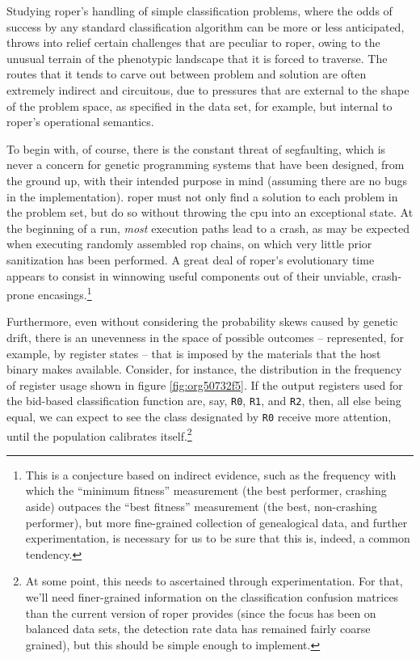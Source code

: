 \documentclass[12pt,glossary]{dalthesis}
\begin{document}
Studying \gls{roper}'s handling of simple classification problems, where the
odds of success by any standard classification algorithm can be more or less
anticipated, throws into relief certain challenges that are peculiar to \gls{roper},
owing to the unusual terrain of the phenotypic landscape that it is forced to
traverse. The routes that it tends to carve out between problem and solution
are often extremely indirect and circuitous, due to pressures that are external
to the shape of the problem space, as specified in the data set, for example, but
internal to \gls{roper}'s operational semantics.

To begin with, of course, there is the constant threat of segfaulting, which is
never a concern for genetic programming systems that have been designed, from the
ground up, with their intended purpose in mind (assuming there are no bugs in the
implementation). \Gls{roper} must not only find a solution to each problem in the
problem set, but do so without throwing the \gls{cpu} into an exceptional state. At
the beginning of a run, \emph{most} execution paths lead to a crash, as may be expected
when executing randomly assembled \gls{rop} chains, on which very little prior
sanitization has been performed. A great deal of \gls{roper's} evolutionary time
appears to consist in winnowing useful components out of their unviable, crash-prone
encasings.\footnote{This is a conjecture based on indirect evidence, such as the frequency with which
  the ``minimum fitness'' measurement (the best performer, crashing aside) outpaces
  the ``best fitness'' measurement (the best, non-crashing performer), but more
  fine-grained collection of genealogical data, and further experimentation, is
  necessary for us to be sure that this is, indeed, a common tendency.} 


Furthermore, even without considering the probability skews caused by genetic drift,
there is an unevenness in the space of possible outcomes -- represented, for example,
by register states -- that is imposed by the materials that the host binary makes
available. Consider, for instance, the distribution in the frequency of register
usage shown in figure \ref{fig:org50732f5}. If the output registers
used for the bid-based classification function are, say, \texttt{R0}, \texttt{R1}, and \texttt{R2}, then,
all else being equal, we can expect to see the class designated by \texttt{R0} receive 
more attention, until the population calibrates itself.\footnote{At some point, this needs to ascertained through experimentation. For that, we'll
  need finer-grained information on the classification confusion matrices than the
  current version of \gls{roper} provides (since the focus has been on balanced data
  sets, the detection rate data has remained fairly coarse grained), but this should
  be simple enough to implement.}
\end{document}
